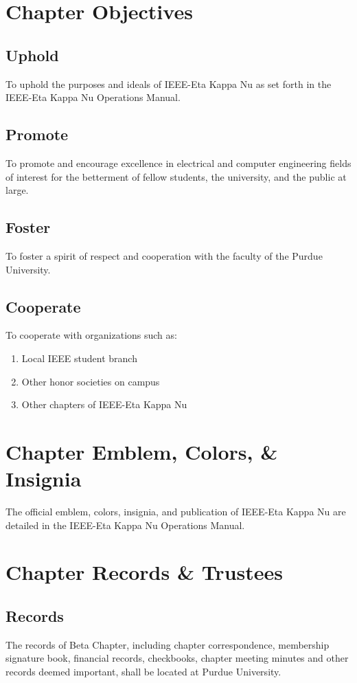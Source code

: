 \documentclass[10pt, oneside]{article}
\begin{document}
\section{Chapter Objectives}
\subsection{Uphold}
To uphold the purposes and ideals of IEEE-Eta Kappa Nu as set forth in the IEEE-Eta Kappa Nu Operations Manual.
\subsection{Promote}
To promote and encourage excellence in electrical and computer engineering fields of interest for the betterment of fellow students, the university, and the public at large.
\subsection{Foster}
To foster a spirit of respect and cooperation with the faculty of the Purdue University.
\subsection{Cooperate}
To cooperate with organizations such as:
\begin{enumerate}[label=\alph*.]
\item Local IEEE student branch
\item Other honor societies on campus
\item Other chapters of IEEE-Eta Kappa Nu
\end{enumerate}

\section{Chapter Emblem, Colors, \& Insignia}
The official emblem, colors, insignia, and publication of IEEE-Eta Kappa Nu are detailed in the IEEE-Eta Kappa Nu Operations Manual.

\section{Chapter Records \& Trustees}
\subsection{Records}
The records of Beta Chapter, including chapter correspondence, membership signature book, financial records, checkbooks, chapter meeting minutes and other records deemed important, shall be located at Purdue University.
\end{document}
